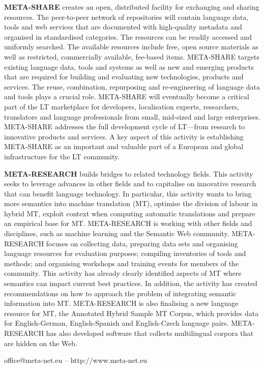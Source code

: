 \begin{multicols}{2}
\textbf{META-SHARE} creates an open, distributed facility for exchanging and sharing resources. The peer-to-peer network of repositories will contain language data, tools and web services that are documented with high-quality metadata and organised in standardised categories. The resources can be readily accessed and uniformly searched. The available resources include free, open source materials as well as restricted, commercially available, fee-based items. META-SHARE targets existing language data, tools and systems as well as new and emerging products that are required for building and evaluating new technologies, products and services. The reuse, combination, repurposing and re-engineering of language data and tools plays a crucial role. META-SHARE will eventually become a critical part of the LT marketplace for developers, localisation experts, researchers, translators and language professionals from small, mid-sized and large enterprises. META-SHARE addresses the full development cycle of LT—from research to innovative products and services. A key aspect of this activity is establishing META-SHARE as an important and valuable part of a European and global infrastructure for the LT community. 

\textbf{META-RESEARCH} builds bridges to related technology fields. This activity seeks to leverage advances in other fields and to capitalise on innovative research that can benefit language technology. In particular, this activity wants to bring more semantics into machine translation (MT), optimise the division of labour in hybrid MT, exploit context when computing automatic translations and prepare an empirical base for MT. META-RESEARCH is working with other fields and disciplines, such as machine learning and the Semantic Web community. META-RESEARCH focuses on collecting data, preparing data sets and organising language resources for evaluation purposes; compiling inventories of tools and methods; and organising workshops and training events for members of the community. This activity has already clearly identified aspects of MT where semantics can impact current best practices. In addition, the activity has created recommendations on how to approach the problem of integrating semantic information into MT. META-RESEARCH is also finalising a new language resource for MT, the Annotated Hybrid Sample MT Corpus, which provides data for English-German, English-Spanish and English-Czech language pairs. META-RESEARCH has also developed software that collects multilingual corpora that are hidden on the Web.
\end{multicols}
\vfill
\centerline{office@meta-net.eu -- http://www.meta-net.eu}

